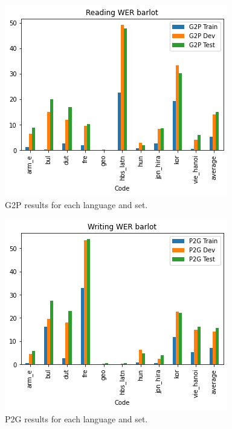 \documentclass[11pt,a4paper]{article}
\begin{document}
\begin{figure}[ht]
    \centering
    \includegraphics[width=\linewidth]{g2p_results.png}
    \caption{G2P results for each language and set.}
    \label{fig:g2p_results}
\end{figure}

\begin{figure}[ht]
    \centering
    \includegraphics[width=\linewidth]{p2g_results.png}
    \caption{P2G results for each language and set.}
    \label{fig:p2g_results}
\end{figure}
\end{document}
